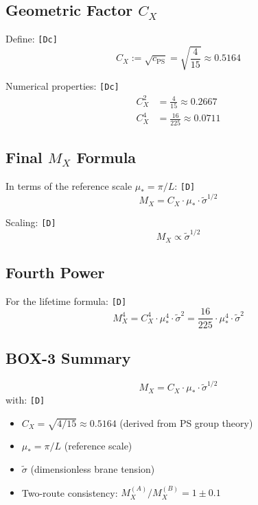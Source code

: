 \documentclass[11pt,a4paper]{article}
\newcommand{\tagD}{\textcolor{green!50!black}{\texttt{[D]}}}
\newcommand{\tagDc}{\textcolor{blue!70!black}{\texttt{[Dc]}}}
\theoremstyle{definition}
\begin{document}
\subsection{Geometric Factor $C_X$}
\label{subsec:cx-factor}

Define: \tagDc{}
\begin{equation}
\label{eq:cx-definition}
C_X := \sqrt{c_{\text{PS}}} = \sqrt{\frac{4}{15}} \approx 0.5164
\end{equation}

Numerical properties: \tagDc{}
\begin{align}
\label{eq:cx-squared}
C_X^2 &= \frac{4}{15} \approx 0.2667 \\
\label{eq:cx-fourth}
C_X^4 &= \frac{16}{225} \approx 0.0711
\end{align}

\subsection{Final $M_X$ Formula}
\label{subsec:mx-final}

In terms of the reference scale $\mu_* = \pi/L$: \tagD{}
\begin{equation}
\label{eq:mx-final-formula}
M_X = C_X \cdot \mu_* \cdot \tilde{\sigma}^{1/2}
\end{equation}

Scaling: \tagD{}
\begin{equation}
\label{eq:mx-scaling}
M_X \propto \tilde{\sigma}^{1/2}
\end{equation}

\subsection{Fourth Power}
\label{subsec:mx-fourth}

For the lifetime formula: \tagD{}
\begin{equation}
\label{eq:mx-fourth-power}
M_X^4 = C_X^4 \cdot \mu_*^4 \cdot \tilde{\sigma}^2 = \frac{16}{225} \cdot \mu_*^4 \cdot \tilde{\sigma}^2
\end{equation}

\subsection{BOX-3 Summary}
\label{subsec:box3-summary}

\begin{derivbox}
\begin{equation}
\label{eq:box3-canonical}
\boxed{M_X = C_X \cdot \mu_* \cdot \tilde{\sigma}^{1/2}}
\end{equation}
with: \tagD{}
\begin{itemize}
  \item $C_X = \sqrt{4/15} \approx 0.5164$ (derived from PS group theory)
  \item $\mu_* = \pi/L$ (reference scale)
  \item $\tilde{\sigma}$ (dimensionless brane tension)
  \item Two-route consistency: $M_X^{(A)}/M_X^{(B)} = 1 \pm 0.1$
\end{itemize}
\end{derivbox}
\end{document}

